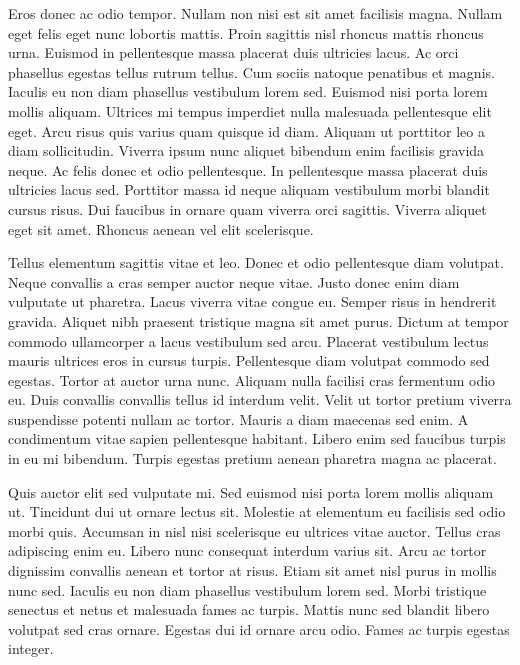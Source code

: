 \documentclass[12pt]{article}
\begin{document}
Eros donec ac odio tempor. Nullam non nisi est sit amet facilisis magna. Nullam eget felis eget nunc lobortis mattis. Proin sagittis nisl rhoncus mattis rhoncus urna. Euismod in pellentesque massa placerat duis ultricies lacus. Ac orci phasellus egestas tellus rutrum tellus. Cum sociis natoque penatibus et magnis. Iaculis eu non diam phasellus vestibulum lorem sed. Euismod nisi porta lorem mollis aliquam. Ultrices mi tempus imperdiet nulla malesuada pellentesque elit eget. Arcu risus quis varius quam quisque id diam. Aliquam ut porttitor leo a diam sollicitudin. Viverra ipsum nunc aliquet bibendum enim facilisis gravida neque. Ac felis donec et odio pellentesque. In pellentesque massa placerat duis ultricies lacus sed. Porttitor massa id neque aliquam vestibulum morbi blandit cursus risus. Dui faucibus in ornare quam viverra orci sagittis. Viverra aliquet eget sit amet. Rhoncus aenean vel elit scelerisque.

Tellus elementum sagittis vitae et leo. Donec et odio pellentesque diam volutpat. Neque convallis a cras semper auctor neque vitae. Justo donec enim diam vulputate ut pharetra. Lacus viverra vitae congue eu. Semper risus in hendrerit gravida. Aliquet nibh praesent tristique magna sit amet purus. Dictum at tempor commodo ullamcorper a lacus vestibulum sed arcu. Placerat vestibulum lectus mauris ultrices eros in cursus turpis. Pellentesque diam volutpat commodo sed egestas. Tortor at auctor urna nunc. Aliquam nulla facilisi cras fermentum odio eu. Duis convallis convallis tellus id interdum velit. Velit ut tortor pretium viverra suspendisse potenti nullam ac tortor. Mauris a diam maecenas sed enim. A condimentum vitae sapien pellentesque habitant. Libero enim sed faucibus turpis in eu mi bibendum. Turpis egestas pretium aenean pharetra magna ac placerat.

Quis auctor elit sed vulputate mi. Sed euismod nisi porta lorem mollis aliquam ut. Tincidunt dui ut ornare lectus sit. Molestie at elementum eu facilisis sed odio morbi quis. Accumsan in nisl nisi scelerisque eu ultrices vitae auctor. Tellus cras adipiscing enim eu. Libero nunc consequat interdum varius sit. Arcu ac tortor dignissim convallis aenean et tortor at risus. Etiam sit amet nisl purus in mollis nunc sed. Iaculis eu non diam phasellus vestibulum lorem sed. Morbi tristique senectus et netus et malesuada fames ac turpis. Mattis nunc sed blandit libero volutpat sed cras ornare. Egestas dui id ornare arcu odio. Fames ac turpis egestas integer.
\end{document}
